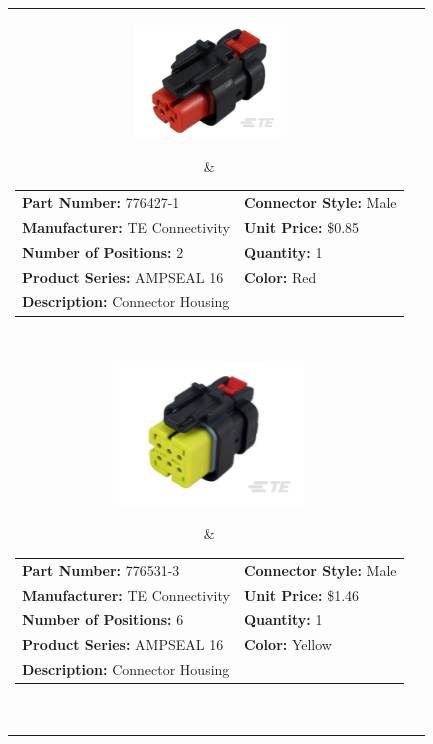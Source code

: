 \documentclass[12pt,letterpaper]{article}
\begin{document}
\begin{longtable}{c l}

\parbox[c]{4cm}{\includegraphics[width=4cm]{776427-1.png} }
& \begin{tabular}{l l}
\textbf{Part Number:} 776427-1 & \textbf{Connector Style:} Male \\
\textbf{Manufacturer:} TE Connectivity & \textbf{Unit Price:} \$0.85 \\
\textbf{Number of Positions:} 2 & \textbf{Quantity:} 1 \\
\textbf{Product Series:} AMPSEAL 16 & \textbf{Color:} Red \\
\multicolumn{2}{p{8cm}}{\textbf{Description:} Connector Housing } \\
\end{tabular} \\

\parbox[c]{5cm}{\includegraphics[width=5cm]{776531-3.png} }
& \begin{tabular}{l l}
\textbf{Part Number:} 776531-3 & \textbf{Connector Style:} Male \\
\textbf{Manufacturer:} TE Connectivity & \textbf{Unit Price:} \$1.46 \\
\textbf{Number of Positions:} 6 & \textbf{Quantity:} 1 \\
\textbf{Product Series:} AMPSEAL 16 & \textbf{Color:} Yellow \\
\multicolumn{2}{p{8cm}}{\textbf{Description:} Connector Housing } \\
\end{tabular} \\


\end{longtable}
\end{document}
